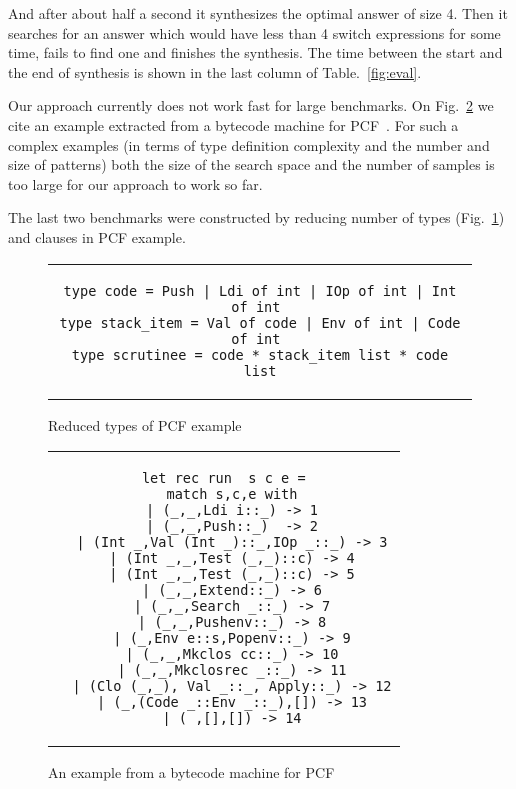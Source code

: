 And after about half a second it synthesizes the optimal answer of size 4. Then it searches for an answer which would have less than 4 switch expressions
for some time, fails to find one and finishes the synthesis. 
The time between the start and the end of synthesis is shown in the last column of Table.~\ref{fig:eval}.

Our approach currently does not work fast for large benchmarks. On Fig.~\ref{fig:pcf} we cite an example extracted from a bytecode
machine for PCF~\cite{maranget2008,Plotkin1977LCFCA}. For such a complex examples (in terms of type definition complexity and the number and size of patterns)
both the size of the search space and the number of samples is too large for our approach to work so far.

The last two benchmarks were constructed by reducing number of types (Fig.~\ref{fig:pcf-reduced}) and clauses in PCF example.%

\begin{figure}%
\centering
\begin{tabular}{c} %
\begin{lstlisting}
type code = Push | Ldi of int | IOp of int | Int of int 
type stack_item = Val of code | Env of int | Code of int 
type scrutinee = code * stack_item list * code list
\end{lstlisting}
\end{tabular}
\caption{Reduced types of PCF example }
\label{fig:pcf-reduced}
\end{figure}

\begin{figure}%
\centering
\begin{tabular}{c} %
\begin{lstlisting}
let rec run  s c e =
  match s,c,e with
  | (_,_,Ldi i::_) -> 1
  | (_,_,Push::_)  -> 2
  | (Int _,Val (Int _)::_,IOp _::_) -> 3
  | (Int _,_,Test (_,_)::c) -> 4
  | (Int _,_,Test (_,_)::c) -> 5
  | (_,_,Extend::_) -> 6
  | (_,_,Search _::_) -> 7
  | (_,_,Pushenv::_) -> 8
  | (_,Env e::s,Popenv::_) -> 9
  | (_,_,Mkclos cc::_) -> 10
  | (_,_,Mkclosrec _::_) -> 11
  | (Clo (_,_), Val _::_, Apply::_) -> 12
  | (_,(Code _::Env _::_),[]) -> 13
  | (_,[],[]) -> 14
\end{lstlisting}
\end{tabular}
\caption{An example from a bytecode machine for PCF}
\label{fig:pcf}
\end{figure}


